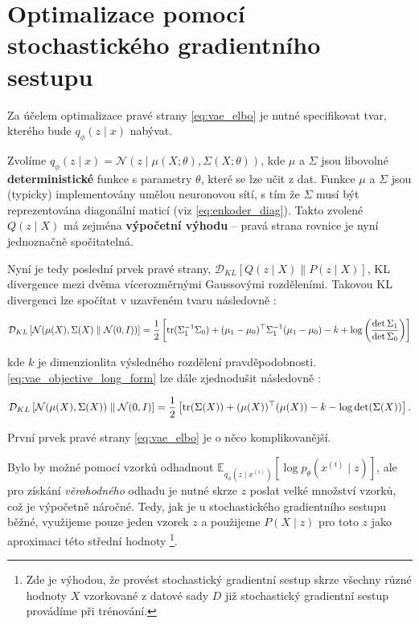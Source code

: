 \section{Optimalizace pomocí stochastického gradientního sestupu}
\label{sec:vae_optimization}

Za účelem optimalizace pravé strany \autoref{eq:vae_elbo} je nutné specifikovat tvar, kterého bude $q_\phi(z\mid x)$ nabývat.

Zvolíme $q_\phi(z\mid x) = \mathcal{N}(z\mid \mu(X;\theta),\Sigma(X;\theta))$, kde $\mu$ a $\Sigma$ jsou libovolné \textbf{deterministické} funkce s parametry $\theta$, které se lze učit z dat.
Funkce $\mu$ a $\Sigma$ jsou (typicky) implementovány umělou neuronovou sítí, s tím že $\Sigma$ musí být reprezentována diagonální maticí (viz \autoref{eq:enkoder_diag}).
Takto zvolené $Q(z\mid X)$ má zejména \textbf{výpočetní výhodu} – pravá strana rovnice je nyní jednoznačně spočitatelná. \cite{Doersch2021}

Nyní je tedy poslední prvek pravé strany, $\mathcal{D}_{KL}\left[ Q(z \mid X)\parallel P(z\mid X) \right]$, KL divergence mezi dvěma vícerozměrnými Gaussovými rozděleními.
Takovou KL divergenci lze spočítat v uzavřeném tvaru následovně \cite{Doersch2021}:

\begin{equation}\label{eq:vae_objective_long_form}
    \mathcal{D}_{KL} \left[ \mathcal{N}(\mu(X), \Sigma(X)\parallel \mathcal{N}(0, I)) \right] = 
    \frac{1}{2}\left[ \operatorname{\text{tr}} (\Sigma_1^{-1}\Sigma_0) + (\mu_1 - \mu_0)^\top \Sigma_1^{-1}(\mu_1 - \mu_0) - k + \log \left(\frac{\det \Sigma_1}{\det \Sigma_0} \right) \right]
\end{equation}

kde $k$ je dimenzionlita výsledného rozdělení pravděpodobnosti. \autoref{eq:vae_objective_long_form} lze dále zjednodušit následovně \cite{Doersch2021}:

\begin{equation}
    \mathcal{D}_{KL} \left[ \mathcal{N}(\mu(X), \Sigma(X)) \parallel \mathcal{N}(0, I) \right] = 
    \frac{1}{2} \left[ \operatorname{\text{tr}} (\Sigma(X)) + (\mu(X))^\top (\mu(X)) - k - \log \det (\Sigma(X)) \right].
\end{equation}

První prvek pravé strany \autoref{eq:vae_elbo} je o něco komplikovanější.

Bylo by možné pomocí vzorků odhadnout $\mathds{E}_{q_\phi(z\mid x^{(i)})} \left[ \log p_\theta(x^{(i)}\mid z) \right]$, ale pro získání \emph{věrohodného} odhadu je nutné skrze $z$ poslat velké množství vzorků, což je výpočetně náročné.
Tedy, jak je u stochastického gradientního sestupu běžné, využijeme pouze jeden vzorek $z$ a použijeme $P(X\mid z)$ pro toto $z$ jako aproximaci této střední hodnoty
\footnote{Zde je výhodou, že provést stochastický gradientní sestup skrze všechny různé hodnoty $X$ vzorkované z datové sady $D$ již stochastický gradientní sestup provádíme při trénování.}. \cite{Doersch2021}


